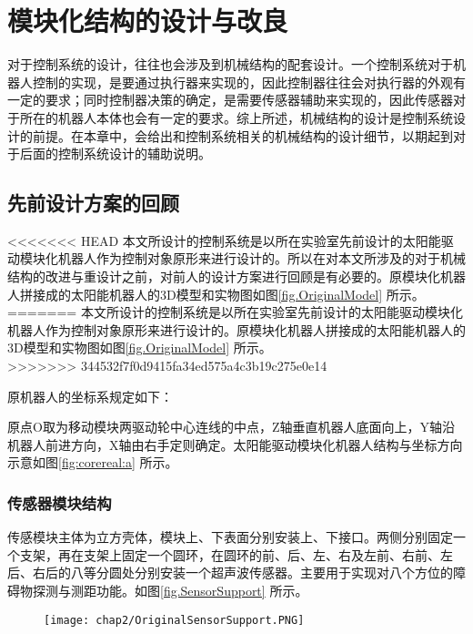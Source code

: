 
\chapter{模块化结构的设计与改良}
\label{chap:mechanicalSystem}
对于控制系统的设计，往往也会涉及到机械结构的配套设计。一个控制系统对于机器人控制的实现，是要通过执行器来实现的，因此控制器往往会对执行器的外观有一定的要求；同时控制器决策的确定，是需要传感器辅助来实现的，因此传感器对于所在的机器人本体也会有一定的要求。综上所述，机械结构的设计是控制系统设计的前提。在本章中，会给出和控制系统相关的机械结构的设计细节，以期起到对于后面的控制系统设计的辅助说明。

\section{先前设计方案的回顾}
<<<<<<< HEAD
本文所设计的控制系统是以所在实验室先前设计的太阳能驱动模块化机器人作为控制对象原形来进行设计的。所以在对本文所涉及的对于机械结构的改进与重设计之前，对前人的设计方案进行回顾是有必要的。原模块化机器人拼接成的太阳能机器人的3D模型和实物图如图\ref{fig.OriginalModel} 所示。 \\
=======
本文所设计的控制系统是以所在实验室先前设计的太阳能驱动模块化机器人作为控制对象原形来进行设计的。原模块化机器人拼接成的太阳能机器人的3D模型和实物图如图\ref{fig.OriginalModel} 所示。 \\
>>>>>>> 344532f7f0d9415fa34ed575a4c3b19c275e0e14
\begin{figure}
  \centering
  \hspace{1in}
\end{figure}
原机器人的坐标系规定如下：

原点O取为移动模块两驱动轮中心连线的中点，Z轴垂直机器人底面向上，Y轴沿机器人前进方向，X轴由右手定则确定。太阳能驱动模块化机器人结构与坐标方向示意如图\ref{fig:corereal:a} 所示。
\subsection{传感器模块结构}
传感模块主体为立方壳体，模块上、下表面分别安装上、下接口。两侧分别固定一个支架，再在支架上固定一个圆环，在圆环的前、后、左、右及左前、右前、左后、右后的八等分圆处分别安装一个超声波传感器。主要用于实现对八个方位的障碍物探测与测距功能。如图\ref{fig.SensorSupport} 所示。
\begin{figure}[!htp]
  \centering
  \texttt{[image: chap2/OriginalSensorSupport.PNG]}
\end{figure}
